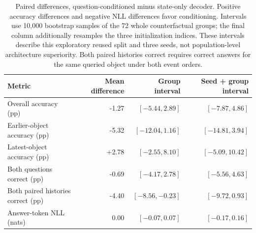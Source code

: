 \begin{table}[t]
\centering\small
\caption{Paired differences, question-conditioned minus state-only decoder. Positive accuracy differences and negative NLL differences favor conditioning. Intervals use 10,000 bootstrap samples of the 72 whole counterfactual groups; the final column additionally resamples the three initialization indices. These intervals describe this exploratory reused split and three seeds, not population-level architecture superiority. Both paired histories correct requires correct answers for the same queried object under both event orders.}
\label{tab:question-decoder-contrasts}
\begin{tabular}{@{}lrrr@{}}
\toprule
Metric & Mean difference & Group interval & Seed + group interval \\
\midrule
Overall accuracy (pp) & -1.27 & $[-5.44, 2.89]$ & $[-7.87, 4.86]$ \\
Earlier-object accuracy (pp) & -5.32 & $[-12.04, 1.16]$ & $[-14.81, 3.94]$ \\
Latest-object accuracy (pp) & +2.78 & $[-2.55, 8.10]$ & $[-5.09, 10.42]$ \\
Both questions correct (pp) & -0.69 & $[-4.17, 2.78]$ & $[-5.56, 4.63]$ \\
Both paired histories correct (pp) & -4.40 & $[-8.56, -0.23]$ & $[-9.72, 0.93]$ \\
Answer-token NLL (nats) & 0.00 & $[-0.07, 0.07]$ & $[-0.17, 0.16]$ \\
\bottomrule
\end{tabular}
\end{table}
